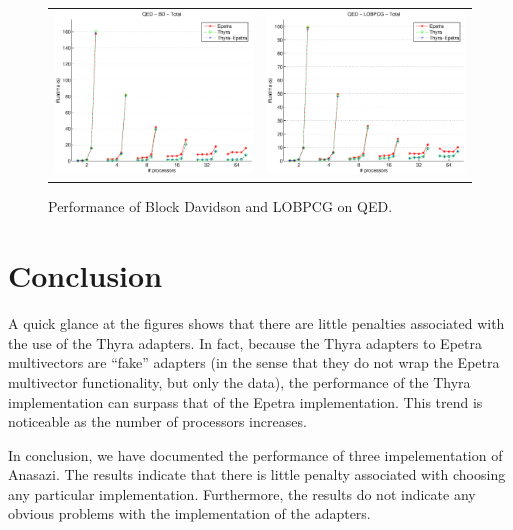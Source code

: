 \documentclass[10pt]{article}
\begin{document}
\begin{figure}[htp]
\begin{tabular}{cc}
\includegraphics[width=2.50in]{results/qed/QED-BD-Total_ln.eps} &
\includegraphics[width=2.50in]{results/qed/QED-LOBPCG-Total_ln.eps} 
\end{tabular}
\caption{Performance of Block Davidson and LOBPCG on QED.}
\label{fig:QED}
\end{figure}


\section{Conclusion}

A quick glance at the figures shows that there are little penalties associated with the
use of the Thyra adapters. In fact, because the Thyra adapters to Epetra multivectors are
``fake'' adapters (in the sense that they do not wrap the Epetra multivector
functionality, but only the data), the performance of the Thyra implementation can surpass
that of the Epetra implementation. This trend is noticeable as the number of processors
increases.

In conclusion, we have documented the performance of three impelementation of Anasazi.
The results indicate that there is little penalty associated with choosing any particular
implementation. Furthermore, the results do not indicate any obvious problems with the
implementation of the adapters.

\newpage
\appendix
\end{document}
